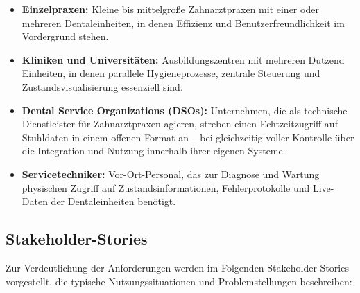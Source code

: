 \begin{itemize}
    \item \textbf{Einzelpraxen:} Kleine bis mittelgroße Zahnarztpraxen mit einer oder mehreren Dentaleinheiten, in denen Effizienz und Benutzerfreundlichkeit im Vordergrund stehen.\\
    \item \textbf{Kliniken und Universitäten:} Ausbildungszentren mit mehreren Dutzend Einheiten, in denen parallele Hygieneprozesse, zentrale Steuerung und Zustandsvisualisierung essenziell sind.\\
    \item \textbf{Dental Service Organizations (DSOs):} Unternehmen, die als technische Dienstleister für Zahnarztpraxen agieren, streben einen Echtzeitzugriff auf Stuhldaten in einem offenen Format an – bei gleichzeitig voller Kontrolle über die Integration und Nutzung innerhalb ihrer eigenen Systeme.\\
    \item \textbf{Servicetechniker:} Vor-Ort-Personal, das zur Diagnose und Wartung physischen Zugriff auf Zustandsinformationen, Fehlerprotokolle und Live-Daten der Dentaleinheiten benötigt.
\end{itemize}

\subsection{Stakeholder-Stories}

Zur Verdeutlichung der Anforderungen werden im Folgenden Stakeholder-Stories vorgestellt, die typische Nutzungssituationen und Problemstellungen beschreiben:


